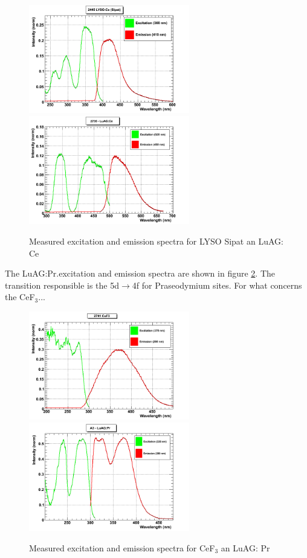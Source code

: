 \begin{figure}[htbp]
\begin{center}
\includegraphics[width=7cm]{../Pictures/Chapter_5/LYSO_Sipat.png}
\includegraphics[width=7cm]{../Pictures/Chapter_5/LuAG_ce.png}
\end{center}
\caption[Sipat - LuAG excitation/emission]{Measured excitation and emission spectra for LYSO Sipat an LuAG: Ce}
\label{fig:luag_lso}
\end{figure}

The LuAG:Pr.excitation and emission spectra are shown in figure \ref{fig:luag_cef3}. The transition responsible is the 5d$\rightarrow$4f for Praseodymium sites.
For what concerns the CeF$_{3}$...

\begin{figure}[htbp]
\begin{center}
\includegraphics[width=7cm]{../Pictures/Chapter_5/cef3.png}
\includegraphics[width=7cm]{../Pictures/Chapter_5/LuAG_pr.png}
\end{center}
\caption[CeF$_{3}$ - LuAG excitation/emission]{Measured excitation and emission spectra for CeF$_{3}$ an LuAG: Pr}
\label{fig:luag_cef3}
\end{figure}

